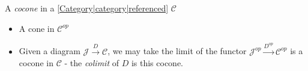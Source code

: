 
A \emph{cocone} in a \ref{Category|category|referenced} $\mathcal{C}$

\begin{itemize}
    \item  A cone in $\mathcal{C}^{op}$
    \item Given a diagram $\mathcal{J}\xrightarrow{D}\mathcal{C}$, we may take the limit of the functor $\mathcal{J}^{op}\xrightarrow{D^{op}}\mathcal{C}^{op}$ is a cocone in $\mathcal{C}$ - the \emph{colimit} of $D$ is this cocone.
  \end{itemize}
